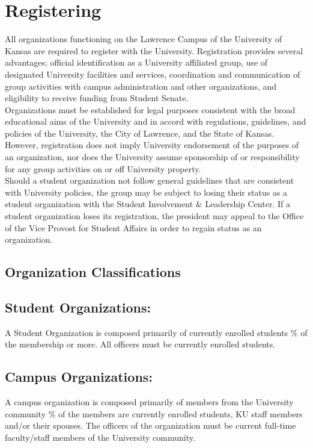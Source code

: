 \section{Registering}
\label{sec:sec02}

All organizations functioning on the Lawrence Campus of the University of Kansas
are required to register with the University. Registration provides several
advantages; official identification as a University affiliated group, use of
designated University facilities and services, coordination and communication
of group activities with campus administration and other organizations, and
eligibility to receive funding from Student Senate.
\\
Organizations must be established for legal purposes consistent with the broad
educational aims of the University and in accord with regulations, guidelines,
and policies of the University, the City of Lawrence, and the State of Kansas.
However, registration does not imply University endorsement of the purposes of
an organization, nor does the University assume sponsorship of or responsibility
for any group activities on or off University property.
\\
Should a student organization not follow general guidelines that are consistent
with University policies, the group may be subject to losing their status as a
student organization with the Student Involvement \& Leadership Center. If a
student organization loses its registration, the president may appeal to the
Office of the Vice Provost for Student Affairs in order to regain status as an
organization.

\subsection{Organization Classifications}

\subsection*{Student Organizations:}
A Student Organization is composed primarily of currently enrolled students
\% of the membership or more. All officers must be currently enrolled
students.

\subsection*{Campus Organizations:}
A campus organization is composed primarily of members from the University
community \% of the members are currently enrolled students, KU staff
members and/or their spouses. The officers of the organization must be current
full-time faculty/staff members of the University community.

